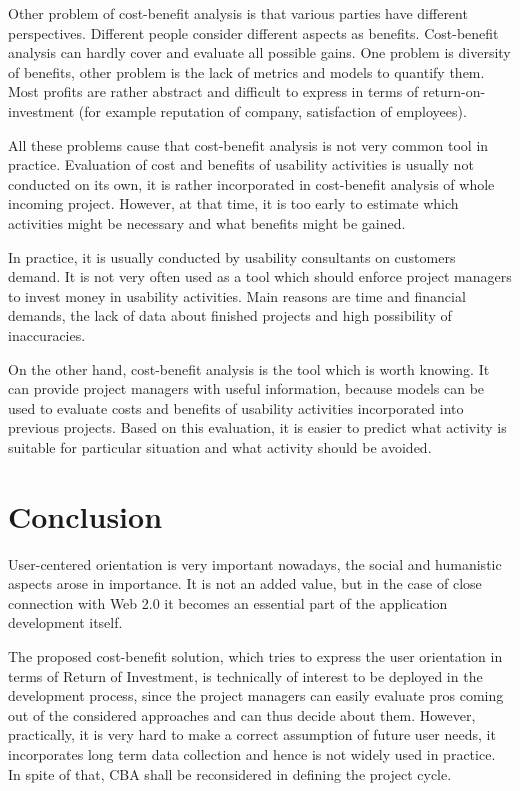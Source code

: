 \documentclass[graybox]{svmult}
\begin{document}
Other problem of cost-benefit analysis is that various parties have different
perspectives. Different people consider different aspects as benefits.
Cost-benefit analysis can hardly cover and evaluate all possible gains. One
problem is diversity of benefits, other problem is the lack of metrics and
models to quantify them. Most profits are rather abstract and difficult to
express in terms of return-on-investment (for example reputation of company,
satisfaction of employees).

All these problems cause that cost-benefit analysis is not very common tool in
practice. Evaluation of cost and benefits of usability activities is usually
not conducted on its own, it is rather incorporated in cost-benefit analysis
of whole incoming project. However, at that time, it is too early to estimate
which activities might be necessary and what benefits might be gained.

In practice, it is usually conducted by usability consultants on customers
demand. It is not very often used as a tool which should enforce project
managers to invest money in usability activities. Main reasons are time and
financial demands, the lack of data about finished projects and high
possibility of inaccuracies.

On the other hand, cost-benefit analysis is the tool which is worth knowing.
It can provide project managers with useful information, because models can be
used to evaluate costs and benefits of usability activities incorporated into
previous projects. Based on this evaluation, it is easier to predict what
activity is suitable for particular situation and what activity should be
avoided.

\section{Conclusion}
User-centered orientation is very important nowadays, the social and
humanistic aspects arose in importance. It is not an added value, but in
the case of close connection with Web 2.0 it becomes an essential part of
the application development itself.

The proposed cost-benefit solution, which tries to express the user
orientation in terms of Return of Investment, is technically of interest to
be deployed in the development process, since the project managers can easily
evaluate pros coming out of the considered approaches and can thus decide
about them. However, practically, it is very hard to make a correct assumption
of future user needs, it incorporates long term data collection and hence is
not widely used in practice. In spite of that, CBA shall be reconsidered in
defining the project cycle. 
\end{document}
